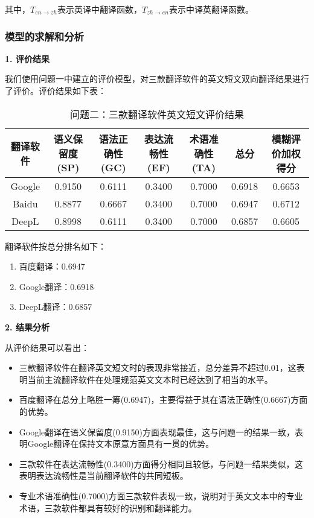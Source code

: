 \documentclass[bwprint]{cumcmthesis}
\begin{document}
其中，$T_{en \to zh}$表示英译中翻译函数，$T_{zh \to en}$表示中译英翻译函数。

\subsubsection{模型的求解和分析}
\textbf{1. 评价结果}

我们使用问题一中建立的评价模型，对三款翻译软件的英文短文双向翻译结果进行了评价。评价结果如下表：

\begin{table}[H]
\centering
\caption{问题二：三款翻译软件英文短文评价结果}
\begin{tabularx}{\textwidth}{CCCCCCC}
\toprule
翻译软件 & 语义保留度(SP) & 语法正确性(GC) & 表达流畅性(EF) & 术语准确性(TA) & 总分 & 模糊评价加权得分 \\
\midrule
Google & 0.9150 & 0.6111 & 0.3400 & 0.7000 & 0.6918 & 0.6653 \\
Baidu & 0.8877 & 0.6667 & 0.3400 & 0.7000 & 0.6947 & 0.6712 \\
DeepL & 0.8998 & 0.6111 & 0.3400 & 0.7000 & 0.6857 & 0.6605 \\
\bottomrule
\end{tabularx}
\label{tab:问题二评价结果}
\end{table}

翻译软件按总分排名如下：
\begin{enumerate}
    \item 百度翻译：0.6947
    \item Google翻译：0.6918
    \item DeepL翻译：0.6857
\end{enumerate}

\textbf{2. 结果分析}

从评价结果可以看出：

\begin{itemize}
    \item 三款翻译软件在翻译英文短文时的表现非常接近，总分差异不超过0.01，这表明当前主流翻译软件在处理规范英文文本时已经达到了相当的水平。
    
    \item 百度翻译在总分上略胜一筹(0.6947)，主要得益于其在语法正确性(0.6667)方面的优势。
    
    \item Google翻译在语义保留度(0.9150)方面表现最佳，这与问题一的结果一致，表明Google翻译在保持文本原意方面具有一贯的优势。
    
    \item 三款软件在表达流畅性(0.3400)方面得分相同且较低，与问题一结果类似，这表明表达流畅性是当前翻译软件的共同短板。
    
    \item 专业术语准确性(0.7000)方面三款软件表现一致，说明对于英文文本中的专业术语，三款软件都具有较好的识别和翻译能力。
\end{itemize}
\end{document}
